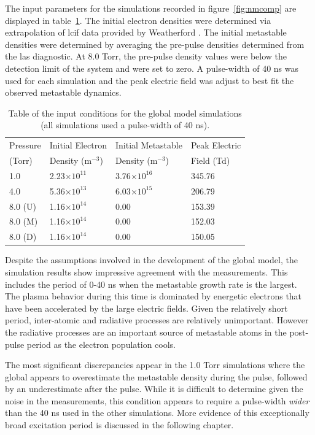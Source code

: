 The input parameters for the simulations recorded in figure~\ref{fig:nmcomp} are
displayed in table~\ref{tbl:ics}. The initial electron densities were determined
via extrapolation of \acs{lcif} data provided by Weatherford
\cite{Weatherford2012a}. The initial metastable densities were determined by
averaging the pre-pulse densities determined from the \acs{las} diagnostic. At
8.0 Torr, the pre-pulse density values were below the detection limit of the
system and were set to zero. A pulse-width of 40 ns was used for each simulation
and the peak electric field was adjust to best fit the observed metastable
dynamics.
\begin{table}
  \centering
  \caption{Table of the input conditions for the global model simulations (all
    simulations used a pulse-width of 40 ns).}
  \label{tbl:ics}
  \begin{tabular}{llll}
    \toprule
    Pressure & Initial Electron    & Initial Metastable  & Peak Electric \\
    (Torr)   & Density (m$^{-3}$)  & Density (m$^{-3}$)  & Field (Td) \\
    \midrule
    1.0      & 2.23$\times10^{11}$ & 3.76$\times10^{16}$ & 345.76 \\
    4.0      & 5.36$\times10^{13}$ & 6.03$\times10^{15}$ & 206.79 \\
    8.0 (U)  & 1.16$\times10^{14}$ & 0.00                & 153.39 \\
    8.0 (M)  & 1.16$\times10^{14}$ & 0.00                & 152.03 \\
    8.0 (D)  & 1.16$\times10^{14}$ & 0.00                & 150.05 \\
    \bottomrule
  \end{tabular}
\end{table}

Despite the assumptions involved in the development of the global model, the
simulation results show impressive agreement with the measurements. This
includes the period of 0-40 ns when the metastable growth rate is the largest.
The plasma behavior during this time is dominated by energetic electrons that
have been accelerated by the large electric fields. Given the relatively short
period, inter-atomic and radiative processes are relatively unimportant. However
the radiative processes are an important source of metastable atoms in the
post-pulse period as the electron population cools.

The most significant discrepancies appear in the 1.0 Torr simulations where the
global appears to overestimate the metastable density during the pulse, followed
by an underestimate after the pulse. While it is difficult to determine given
the noise in the measurements, this condition appears to require a pulse-width
\emph{wider} than the 40 ns used in the other simulations. More evidence of this
exceptionally broad excitation period is discussed in the following chapter.

